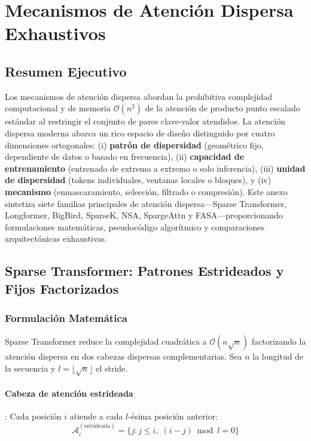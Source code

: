 \section{Mecanismos de Atención Dispersa Exhaustivos}
\label{sec:annex-sparse}

\subsection{Resumen Ejecutivo}

Los mecanismos de atención dispersa abordan la prohibitiva complejidad computacional y de memoria $\mathcal{O}(n^2)$ de la atención de producto punto escalado estándar al restringir el conjunto de pares clave-valor atendidos. La atención dispersa moderna abarca un rico espacio de diseño distinguido por cuatro dimensiones ortogonales: (i) \textbf{patrón de dispersidad} (geométrico fijo, dependiente de datos o basado en frecuencia), (ii) \textbf{capacidad de entrenamiento} (entrenado de extremo a extremo o solo inferencia), (iii) \textbf{unidad de dispersidad} (tokens individuales, ventanas locales o bloques), y (iv) \textbf{mecanismo} (enmascaramiento, selección, filtrado o compresión). Este anexo sintetiza siete familias principales de atención dispersa---Sparse Transformer, Longformer, BigBird, SparseK, NSA, SpargeAttn y FASA---proporcionando formulaciones matemáticas, pseudocódigo algorítmico y comparaciones arquitectónicas exhaustivas.

\subsection{Sparse Transformer: Patrones Estrideados y Fijos Factorizados}

\subsubsection{Formulación Matemática}

Sparse Transformer \citep{child_sparse_transformer_2019} reduce la complejidad cuadrática a $\mathcal{O}(n\sqrt{n})$ factorizando la atención dispersa en dos cabezas dispersas complementarias. Sea $n$ la longitud de la secuencia y $l = \lfloor\sqrt{n}\rfloor$ el stride.

\paragraph{Cabeza de atención estrideada}: Cada posición $i$ atiende a cada $l$-ésima posición anterior:
\[
\mathcal{A}_i^{(\text{estrideada})} = \{j : j \leq i,\; (i - j) \bmod l = 0\}
\]

